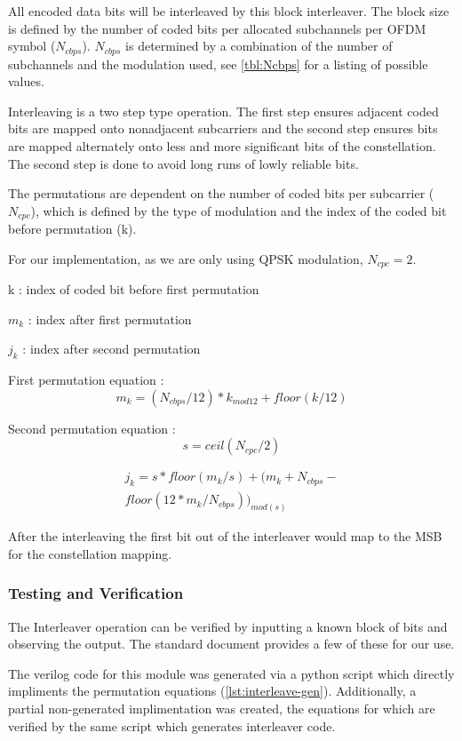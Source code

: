 All encoded data bits will be interleaved by this block interleaver. The
block size is defined by the number of coded bits per allocated subchannels 
per OFDM symbol ($N_{cbps}$). $N_{cbps}$ is determined by a
combination of the number of subchannels and the modulation used, see
\autoref{tbl:Ncbps} for a listing of possible values.

Interleaving is a two step type operation. The first step ensures adjacent 
coded bits are mapped onto nonadjacent subcarriers and the second step 
ensures bits are mapped alternately onto less and more significant bits of
the constellation. The second step is done to avoid long runs of lowly
reliable bits.
 
The permutations are dependent on the number of coded bits per subcarrier
($N_{cpc}$), which is defined by the type of modulation and the index of the
coded bit before permutation (k).

For our implementation, as we are only using QPSK modulation,
$N_{cpc} = 2$.

k : index of coded bit before first permutation

$m_{k}$ : index after first permutation

$j_{k}$ : index after second permutation 

First permutation equation :
\begin{equation}
m_k = (N_{cbps}/12)*k_{mod12}+floor(k/12)
\end{equation}

Second permutation equation :
\begin{equation}
s=ceil(N_{cpc}/2)
\end{equation}

\begin{eqnarray}
j_k = s*floor(m_{k}/s)+(m_{k}+N_{cbps}- \nonumber \\
	floor(12*m_k/N_{cbps}))_{mod(s)}
\end{eqnarray}

After the interleaving the first bit out of the interleaver would map to the
MSB for the constellation mapping. 

	\subsubsection{Testing and Verification}
	The Interleaver operation can be verified by inputting a known block
	of bits and observing the output. The standard document provides a few of these for our use.

	The verilog code for this module was generated via a python script which directly impliments the permutation equations (\autoref{lst:interleave-gen}). Additionally, a partial non-generated implimentation was created, the equations for which are verified by the same script which generates interleaver code.


